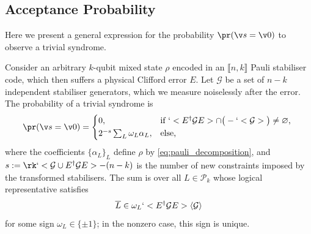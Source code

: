 \subsection{Acceptance Probability}
\label{sec:acceptance_probability}
Here we present a general expression for
the probability $\pr(\v s =\v 0)$ to observe a trivial syndrome.
\begin{theorem}
\label{theorem:probability_trivial_syndrome}
Consider an arbitrary $k$-qubit mixed state $\rho$
encoded in an $\llbracket n, k\rrbracket$ Pauli stabiliser code,
which then suffers a physical Clifford error $E$.
Let $\mathcal G$ be a set of $n-k$ independent stabiliser
generators, which we measure noiselessly after the error.
The probability of a trivial syndrome is
\begin{equation}
\label{eq:probability_trivial_syndrome}
\pr(\v s =\v 0)
=\begin{cases*}
0, & if $`<E^\dagger \mathcal G E>
\cap \big(-`<\mathcal G>\big)
\neq \varnothing$, \\
2^{-s} \sum_{L} \omega_L \alpha_L,
& else,
\end{cases*}
\end{equation}
where the coefficients $\{\alpha_L\}_L$ define $\rho$ by
\cref{eq:pauli_decomposition},
and $s :=\rk`< \mathcal G\cup E^\dagger\mathcal G E > -(n -k)$ is
the number of new constraints imposed by the transformed stabilisers.
The sum is over all $L\in\mathcal P_k$ whose logical representative satisfies
\begin{equation}
\label{eq:logical_membership}
\overline L
\in \omega_L
`<E^\dagger \mathcal G E>
\langle\mathcal G\rangle
\end{equation}
for some sign $\omega_L\in\{\pm1\}$;
in the nonzero case, this sign is unique.
\end{theorem}



